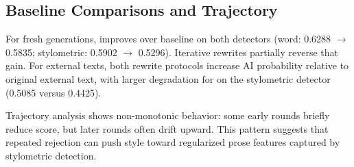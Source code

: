 \subsection{Baseline Comparisons and Trajectory}
For fresh generations, \oneshot improves over baseline on both detectors (word: 0.6288 $\rightarrow$ 0.5835; stylometric: 0.5902 $\rightarrow$ 0.5296). Iterative rewrites partially reverse that gain. For external texts, both rewrite protocols increase AI probability relative to original external text, with larger degradation for \iterative on the stylometric detector (0.5085 versus 0.4425).

Trajectory analysis shows non-monotonic behavior: some early rounds briefly reduce score, but later rounds often drift upward. This pattern suggests that repeated rejection can push style toward regularized prose features captured by stylometric detection.
